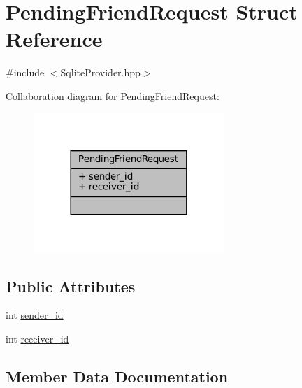 \hypertarget{structPendingFriendRequest}{}\section{Pending\+Friend\+Request Struct Reference}
\label{structPendingFriendRequest}


{\ttfamily \#include $<$Sqlite\+Provider.\+hpp$>$}



Collaboration diagram for Pending\+Friend\+Request\+:
\nopagebreak
\begin{figure}[H]
\begin{center}
\leavevmode
\includegraphics[width=204pt]{structPendingFriendRequest__coll__graph}
\end{center}
\end{figure}
\subsection*{Public Attributes}
\begin{DoxyCompactItemize}
\item 
int \mbox{\hyperlink{structPendingFriendRequest_a97698308250bf5be4d12079f53aed946}{sender\+\_\+id}}
\item 
int \mbox{\hyperlink{structPendingFriendRequest_a1b89fd63b19b25f6ace5ab06fbb104a3}{receiver\+\_\+id}}
\end{DoxyCompactItemize}


\subsection{Member Data Documentation}
\mbox{\label{structPendingFriendRequest_a1b89fd63b19b25f6ace5ab06fbb104a3}} 

